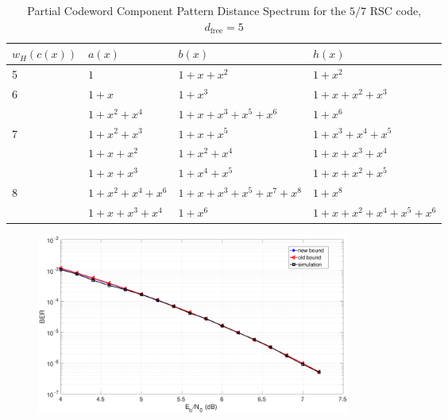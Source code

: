 \begin{table}[htbp]
 \caption{Partial Codeword Component Pattern Distance Spectrum for the $5/7$ RSC code, $d_{\text{free}}=5$}
\centering
 \begin{tabularx}{0.75\textwidth}{Xlll} 
 \hline
 $w_H(c(x))$& $a(x)$ & $b(x)$ & $h(x)$ \\ %
 \hline\hline
5&$1$ & $1+x+x^{2}$ & $1+x^2$\\
\hline
\hline
6&$1+x$ & $1+x^3$ & $1+x+x^2+x^3$\\
&$1+x^2+x^4$ & $1+x+x^3+x^5+x^6$ & $1+x^{6}$\\
\hline\hline
7&$1+x^2+x^3$ & $1+x+x^5$ & $1+x^3+x^4+x^5$\\
&$1+x+x^2$ & $1+x^2+x^4$ & $1+x+x^3+x^4$\\
&$1+x+x^3$ & $1+x^4+x^5$ & $1+x+x^2+x^5$\\
\hline \hline
8&$1+x^2+x^4+x^6$ & $1+x+x^3+x^5+x^7+x^8$ & $1+x^8$\\
&$1+x+x^3+x^4$ & $1+x^6$ & $1+x+x^2+x^4+x^5+x^6$\\
\hline
 \end{tabularx}
 
 \label{novelTab13}
\end{table}

\begin{figure}[htbp]
\centering
		\includegraphics[width=0.5\textwidth]{./Images/RSC_5_7_lower_weights.eps}
		\label{simFig1}
		\end{figure}
		
